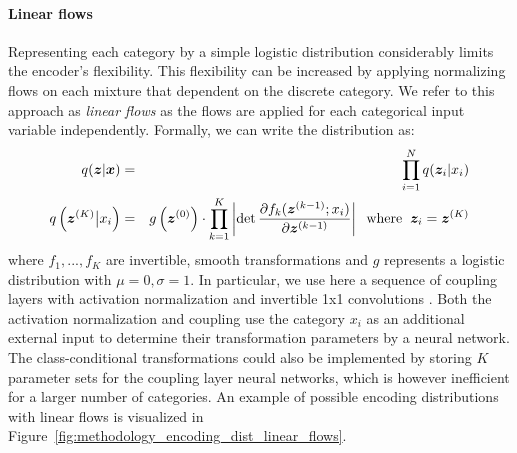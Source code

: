 \paragraph{Linear flows} Representing each category by a simple logistic distribution considerably limits the encoder's flexibility. 
This flexibility can be increased by applying normalizing flows on each mixture that dependent on the discrete category. 
We refer to this approach as \textit{linear flows} as the flows are applied for each categorical input variable independently.
Formally, we can write the distribution as: 
\begin{eqnarray}
    q(\bm{z}|\bm{x}) & = & \prod_{i=1}^{N} q(\bm{z}_i|x_i)\\
    q\left(\bm{z}^{(K)}\big\vert x_i\right) & = & g\left(\bm{z}^{(0)}\right) \cdot \prod_{k=1}^{K} \left|\det \frac{\partial f_k(\bm{z}^{(k-1)}; x_i)}{\partial \bm{z}^{(k-1)}}\right|\hspace{2mm}\text{where}\hspace{2mm}\bm{z}_i=\bm{z}^{(K)}
\end{eqnarray}
where $f_1,...,f_K$ are invertible, smooth transformations and $g$ represents a logistic distribution with $\mu=0, \sigma=1$. 
In particular, we use here a sequence of coupling layers with activation normalization and invertible 1x1 convolutions \cite{Glow}. 
Both the activation normalization and coupling use the category $x_i$ as an additional external input to determine their transformation parameters by a neural network. 
The class-conditional transformations could also be implemented by storing $K$ parameter sets for the coupling layer neural networks, which is however inefficient for a larger number of categories.  
An example of possible encoding distributions with linear flows is visualized in Figure~\ref{fig:methodology_encoding_dist_linear_flows}. 

